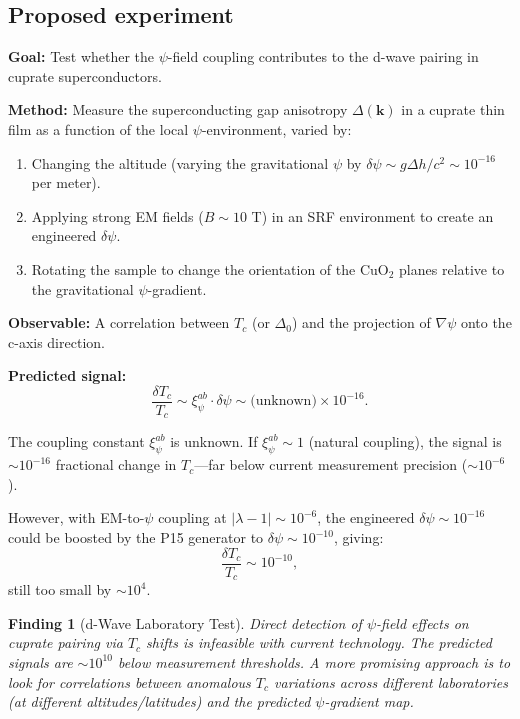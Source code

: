 \documentclass[11pt]{article}
\newtheorem{finding}{Finding}
\begin{document}
\subsection{Proposed experiment}

\textbf{Goal:} Test whether the $\psi$-field coupling contributes to the d-wave pairing in cuprate superconductors.

\textbf{Method:} Measure the superconducting gap anisotropy $\Delta(\mathbf{k})$ in a cuprate thin film as a function of the local $\psi$-environment, varied by:
\begin{enumerate}
\item Changing the altitude (varying the gravitational $\psi$ by $\delta\psi \sim g\Delta h/c^2 \sim 10^{-16}$ per meter).
\item Applying strong EM fields ($B \sim 10$ T) in an SRF environment to create an engineered $\delta\psi$.
\item Rotating the sample to change the orientation of the CuO$_2$ planes relative to the gravitational $\psi$-gradient.
\end{enumerate}

\textbf{Observable:} A correlation between $T_c$ (or $\Delta_0$) and the projection of $\nabla\psi$ onto the c-axis direction.

\textbf{Predicted signal:}
\[
\frac{\delta T_c}{T_c} \sim \xi_\psi^{ab} \cdot \delta\psi \sim \text{(unknown)} \times 10^{-16}.
\]

The coupling constant $\xi_\psi^{ab}$ is unknown. If $\xi_\psi^{ab} \sim 1$ (natural coupling), the signal is $\sim 10^{-16}$ fractional change in $T_c$---far below current measurement precision ($\sim 10^{-6}$).

However, with EM-to-$\psi$ coupling at $|\lambda-1| \sim 10^{-6}$, the engineered $\delta\psi \sim 10^{-16}$ could be boosted by the P15 generator to $\delta\psi \sim 10^{-10}$, giving:
\[
\frac{\delta T_c}{T_c} \sim 10^{-10},
\]
still too small by $\sim 10^4$.

\begin{finding}[d-Wave Laboratory Test]
Direct detection of $\psi$-field effects on cuprate pairing via $T_c$ shifts is infeasible with current technology. The predicted signals are $\sim 10^{10}$ below measurement thresholds. A more promising approach is to look for \emph{correlations} between anomalous $T_c$ variations across different laboratories (at different altitudes/latitudes) and the predicted $\psi$-gradient map.
\end{finding}
\end{document}
